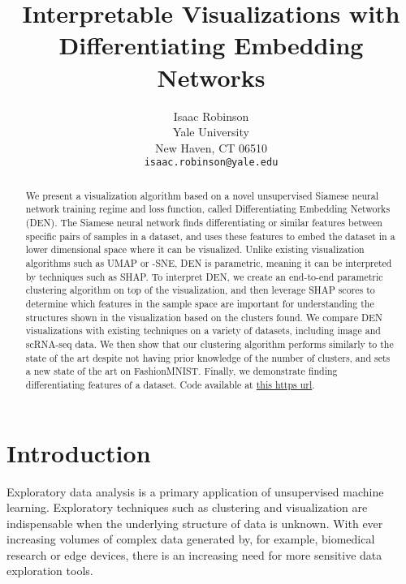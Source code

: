 \documentclass{article}
\title{Interpretable Visualizations with Differentiating Embedding Networks}
\author{Isaac Robinson \\
  Yale University\\
  New Haven, CT 06510 \\
  \texttt{isaac.robinson@yale.edu} \\
}
\begin{document}
\maketitle



\begin{abstract}
    We present a visualization algorithm based on a novel unsupervised Siamese neural network training regime and loss function, called Differentiating Embedding Networks (DEN). The Siamese neural network finds differentiating or similar features between specific pairs of samples in a dataset, and uses these features to embed the dataset in a lower dimensional space where it can be visualized. Unlike existing visualization algorithms such as UMAP or -SNE, DEN is parametric, meaning it can be interpreted by techniques such as SHAP. To interpret DEN, we create an end-to-end parametric clustering algorithm on top of the visualization, and then leverage SHAP scores to determine which features in the sample space are important for understanding the structures shown in the visualization based on the clusters found. We compare DEN visualizations with existing techniques on a variety of datasets, including image and scRNA-seq data. We then show that our clustering algorithm performs similarly to the state of the art despite not having prior knowledge of the number of clusters, and sets a new state of the art on FashionMNIST. Finally, we demonstrate finding differentiating features of a dataset. Code available at \href{https://github.com/isaacrob/DEN}{this https url}.
\end{abstract}

\section{Introduction}













Exploratory data analysis is a primary application of unsupervised machine learning. Exploratory techniques such as clustering and visualization are indispensable when the underlying structure of data is unknown. With ever increasing volumes of complex data generated by, for example, biomedical research or edge devices, there is an increasing need for more sensitive data exploration tools.
\end{document}
